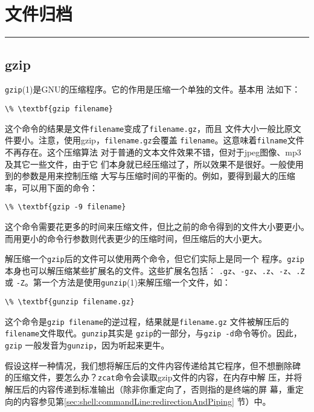 
\chapter{文件归档}
\label{chap:archiveFiles}
\begin{flushleft}
\rule[0mm]{\textwidth}{.1pt}
\end{flushleft}

\section{gzip}
\label{sec:archiveFiles:gzip}

\texttt{gzip}(1)是GNU的压缩程序。它的作用是压缩一个单独的文件。基本用
法如下：
\begin{Verbatim}[frame=single, commandchars=\\\{\}]
\% \textbf{gzip filename}
\end{Verbatim}

这个命令的结果是文件\texttt{filename}变成了\texttt{filename.gz}，而且
文件大小一般比原文件要小。注意，使用gzip，\texttt{filename.gz}会覆盖
\texttt{filename}。这意味着\texttt{filname}文件不再存在。这个压缩算法
对于普通的文本文件效果不错，但对于jpeg图像、mp3及其它一些文件，由于它
们本身就已经压缩过了，所以效果不是很好。一般使用到的参数是用来控制压缩
大写与压缩时间的平衡的。例如，要得到最大的压缩率，可以用下面的命令：
\begin{Verbatim}[frame=single, commandchars=\\\{\}]
\% \textbf{gzip -9 filename}
\end{Verbatim}
这个命令需要花更多的时间来压缩文件，但比之前的命令得到的文件大小要更小。
而用更小的命令行参数则代表更少的压缩时间，但压缩后的大小更大。

解压缩一个\texttt{gzip}后的文件可以使用两个命令，但它们实际上是同一个
程序。\texttt{gzip}本身也可以解压缩某些扩展名的文件。这些扩展名包括：
\texttt{.gz}、\texttt{-gz}、\texttt{.z}、\texttt{-z}、\texttt{.Z}或
\texttt{-Z}。第一个方法是使用\texttt{gunzip}(1)来解压缩一个文件，如：
\begin{Verbatim}[frame=single, commandchars=\\\{\}]
\% \textbf{gunzip filename.gz}
\end{Verbatim}
这个命令是\texttt{gzip filename}的逆过程，结果就是\texttt{filename.gz}
文件被解压后的\texttt{filename}文件取代。\texttt{gunzip}其实是
\texttt{gzip}的一部分，与\texttt{gzip -d}命令等价。因此，\texttt{gzip}
一般发音为\texttt{gunzip}，因为听起来更牛。

假设这样一种情况，我们想将解压后的文件内容传递给其它程序，但不想删除碑
的压缩文件，要怎么办？\texttt{zcat}命令会读取gzip文件的内容，在内存中解
压，并将解压后的内容传递到标准输出（除非你重定向了，否则指的是终端的屏
幕，重定向的内容参见第\ref{sec:shell:commandLine:redirectionAndPiping}
节）中。

